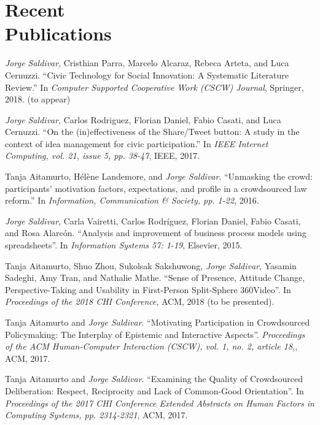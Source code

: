 
\section{Recent\\Publications}


\textit{Jorge Saldivar}, Cristhian Parra, Marcelo Alcaraz, Rebeca Arteta, and Luca Cernuzzi. ``Civic Technology for Social Innovation: A Systematic Literature Review.'' In \textit{Computer Supported Cooperative Work (CSCW) Journal}, Springer, 2018. (to appear)

\textit{Jorge Saldivar}, Carlos Rodriguez, Florian Daniel, Fabio Casati, and Luca Cernuzzi. ``On the (in)effectiveness of the Share/Tweet button: A study in the context of idea management for civic participation.'' In \textit{IEEE Internet Computing, vol. 21, issue 5, pp. 38-47}, IEEE, 2017.

Tanja Aitamurto, Hélène Landemore, and \textit{Jorge Saldivar}. ``Unmasking the crowd: participants’ motivation factors, expectations, and profile in a crowdsourced law reform.'' In \textit{Information, Communication \& Society, pp. 1-22}, 2016.

\textit{Jorge Saldivar}, Carla Vairetti, Carlos Rodríguez, Florian Daniel, Fabio Casati, and Rosa Alarcón. ``Analysis and improvement of business process models using spreadsheets''. In \textit{Information Systems 57: 1-19}, Elsevier, 2015.


Tanja Aitamurto, Shuo Zhou, Sukolsak Sakshuwong, \textit{Jorge Saldivar}, Yasamin Sadeghi, Amy Tran, and Nathalie Mathe. ``Sense of Presence, Attitude Change, Perspective-Taking and Usability in First-Person Split-Sphere 360\degree Video''. In \textit{Proceedings of the 2018 CHI Conference}, ACM, 2018 (to be presented).

Tanja Aitamurto and \textit{Jorge Saldivar}. ``Motivating Participation in Crowdsourced Policymaking: The Interplay of Epistemic and Interactive Aspects''. \textit{Proceedings of the ACM Human-Computer Interaction (CSCW), vol. 1, no. 2, article 18,}, ACM, 2017.

Tanja Aitamurto and \textit{Jorge Saldivar}. ``Examining the Quality of Crowdsourced Deliberation: Respect, Reciprocity and Lack of Common-Good Orientation''. In \textit{Proceedings of the 2017 CHI Conference Extended Abstracts on Human Factors in Computing Systems, pp. 2314-2321}, ACM, 2017.

